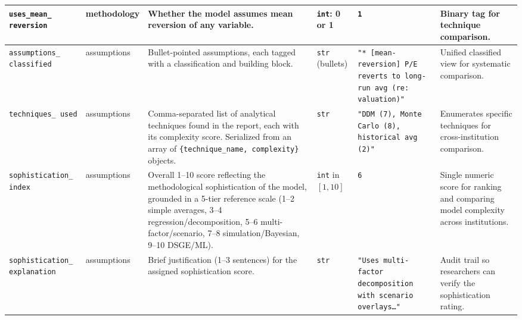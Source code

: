 \documentclass[11pt,a4paper]{article}
\begin{document}
\begin{longtable}{@{} L{2.8cm} L{2.2cm} L{3.2cm} L{2.2cm} L{2.5cm} L{3cm} @{}}
\texttt{uses\_mean\_ reversion}
  & methodology
  & Whether the model assumes mean reversion of any variable.
  & \texttt{int}: 0 or 1
  & \texttt{1}
  & Binary tag for technique comparison. \\
\midrule

\texttt{assumptions\_ classified}
  & assumptions
  & Bullet-pointed assumptions, each tagged with a classification and building block.
  & \texttt{str} (bullets)
  & \texttt{"* [mean-reversion] P/E reverts to long-run avg (re: valuation)"}
  & Unified classified view for systematic comparison. \\
\midrule

\texttt{techniques\_ used}
  & assumptions
  & Comma-separated list of analytical techniques found in the report, each with its complexity score. Serialized from an array of \texttt{\{technique\_name, complexity\}} objects.
  & \texttt{str}
  & \texttt{"DDM (7), Monte Carlo (8), historical avg (2)"}
  & Enumerates specific techniques for cross-institution comparison. \\
\midrule

\texttt{sophistication\_ index}
  & assumptions
  & Overall 1--10 score reflecting the methodological sophistication of the model, grounded in a 5-tier reference scale (1--2 simple averages, 3--4 regression/decomposition, 5--6 multi-factor/scenario, 7--8 simulation/Bayesian, 9--10 DSGE/ML).
  & \texttt{int} in $[1, 10]$
  & \texttt{6}
  & Single numeric score for ranking and comparing model complexity across institutions. \\
\midrule

\texttt{sophistication\_ explanation}
  & assumptions
  & Brief justification (1--3 sentences) for the assigned sophistication score.
  & \texttt{str}
  & \texttt{"Uses multi-factor decomposition with scenario overlays\ldots"}
  & Audit trail so researchers can verify the sophistication rating. \\

\end{longtable}
\end{document}
